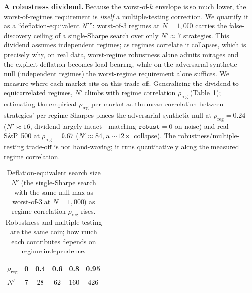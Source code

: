 \documentclass[sigconf,review,anonymous]{acmart}
\begin{document}
\textbf{A robustness dividend.} Because the worst-of-$k$ envelope is so much lower, the worst-of-regimes requirement is \emph{itself} a multiple-testing correction. We quantify it as a ``deflation-equivalent $N'$'': worst-of-3 regimes at $N{=}1{,}000$ carries the false-discovery ceiling of a single-Sharpe search over only $N'{\approx}7$ strategies. This dividend assumes independent regimes; as regimes correlate it collapses, which is precisely why, on real data, worst-regime robustness alone admits mirages and the explicit deflation becomes load-bearing, while on the adversarial synthetic null (independent regimes) the worst-regime requirement alone suffices. We measure where each market sits on this trade-off. Generalizing the dividend to equicorrelated regimes, $N'$ climbs with regime correlation $\rho_{\text{reg}}$ (Table~\ref{tab:regime}); estimating the empirical $\rho_{\text{reg}}$ per market as the mean correlation between strategies' per-regime Sharpes places the adversarial synthetic null at $\rho_{\text{reg}}{=}0.24$ ($N'{\approx}16$, dividend largely intact---matching $\texttt{robust}{=}0$ on noise) and real S\&P~500 at $\rho_{\text{reg}}{=}0.67$ ($N'{\approx}84$, a ${\sim}12\times$ collapse). The robustness/multiple-testing trade-off is not hand-waving; it runs quantitatively along the measured regime correlation.

\begin{table}[t]
\caption{Deflation-equivalent search size $N'$ (the single-Sharpe search with the same null-max as worst-of-3 at $N{=}1{,}000$) as regime correlation $\rho_{\text{reg}}$ rises. Robustness and multiple testing are the same coin; how much each contributes depends on regime independence.}
\label{tab:regime}
\small
\begin{tabular}{@{}lccccc@{}}
\toprule
$\rho_{\text{reg}}$ & 0 & 0.4 & 0.6 & 0.8 & 0.95 \\
\midrule
$N'$ & 7 & 28 & 62 & 160 & 426 \\
\bottomrule
\end{tabular}
\end{table}
\end{document}
